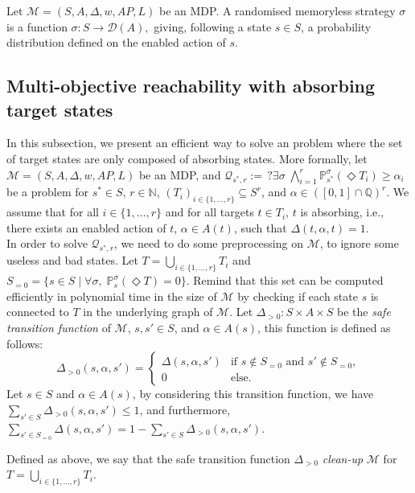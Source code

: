 \begin{definition}
  Let \sloppy$\mathcal{M}=(S, A, \Delta, w, AP, L)$ be an MDP. A randomised memoryless strategy $\sigma$ is a function
  $
    \sigma: S \rightarrow \mathcal{D}(A),
  $ giving, following a state $s \in S$, a probability distribution defined on the enabled action of $s$.
\end{definition}

\subsection{Multi-objective reachability with absorbing target \sloppy states}

In this subsection, we present an efficient way to solve an \MOSR{} problem where the set of target states are only composed of absorbing states. More formally, let $\mathcal{M}=(S, A, \Delta, w, AP, L)$ be an MDP, and
$
  \mathcal{Q}_{s^*, r} := \,?\exists \sigma\; \bigwedge_{i=1}^r \mathbb{P}^\sigma_{s^*}(\Diamond T_i) \geq \alpha_i
$
be a \MOSR{} problem for $s^* \in S$, $r \in \mathbb{N}$, $(T_i)_{i \in \{1, \dots, r\}} \subseteq S^r$, and $\alpha \in ([0, 1] \cap \mathbb{Q})^r$.
We assume that for all $i \in \{ 1, \dots, r\}$ and for all targets $t \in T_i$, $t$ is absorbing, i.e., there exists an enabled action of $t$, $\alpha \in A(t)$, such that $\Delta(t, \alpha, t) = 1$.\\

In order to solve $\mathcal{Q}_{s^*, r}$, we need to do some preprocessing on $\mathcal{M}$, to ignore some useless and bad states.
Let $T = \bigcup_{i \in \{1, \dots, r\}} T_i$ and $S_{=0} = \{s \in S \; | \; \forall \sigma, \; \mathbb{P}_{s}^\sigma(\Diamond T) = 0\}$.
  Remind that this set can be computed efficiently in polynomial time in the size of $\mathcal{M}$ by checking if each state $s$ is connected to $T$ in the underlying graph of $\mathcal{M}$.
Let $\Delta_{>0} : S \times A \times S$ be the \textit{safe transition function} of $\mathcal{M}$, $s, s' \in S$, and $\alpha \in A(s)$, this function is defined as follows:
  \[
    \Delta_{>0}(s, \alpha, s') = \begin{cases}
      \Delta(s, \alpha, s') &\text{if } s \not \in S_{=0} \text{ and } s' \not\in S_{=0}, \\
      0 &\text{else}.
    \end{cases}
  \]
  Let $s \in S$ and $\alpha \in A(s)$,
  by considering this transition function, we have \sloppy$\sum_{s' \in S} \Delta_{>0}(s, \alpha, s') \leq 1$, and furthermore,
      $\sum_{s' \in S_{=0}} \Delta(s, \alpha, s') =
      1 - \sum_{s' \in S} \Delta_{>0}(s, \alpha, s') $.
\begin{notation}
  Defined as above, we say that the safe transition function $\Delta_{>0}$ \textit{clean-up} $\mathcal{M}$ for $T = \bigcup_{i \in \{1, \dots, r\}} T_i$.
\end{notation}

